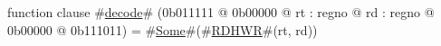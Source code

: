 function clause #\hyperref[zdecode]{decode}# (0b011111 @ 0b00000 @ rt : regno @ rd : regno @ 0b00000 @ 0b111011) =
  #\hyperref[zSome]{Some}#(#\hyperref[zRDHWR]{RDHWR}#(rt, rd))
